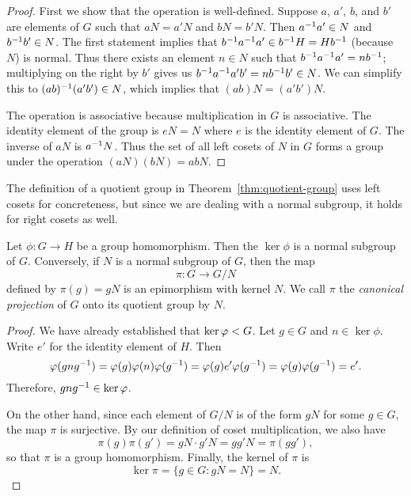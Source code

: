 \begin{proof}
    First we show that the operation is well-defined. Suppose \(a\), \(a'\),
    \(b\), and \(b'\) are elements of \(G\) such that \(aN = a'N\) and \(bN =
    b'N\). Then \(a^{-1} a' \in N\) and \(b^{-1} b' \in N\). The first statement
    implies that \(b^{-1} a^{-1} a' \in b^{-1} H = Hb^{-1}\) (because \(N\)) is
    normal. Thus there exists an element \(n \in N\) such that \(b^{-1} a^{-1} a'
    = nb^{-1}\); multiplying on the right by \(b'\) gives us \(b^{-1} a^{-1} a'b' =
    nb^{-1} b' \in N\). We can simplify this to \((ab)^{-1}(a'b') \in N\), which
    implies that \((ab)N = (a'b')N\).

    The operation is associative because multiplication in \(G\) is associative.
    The identity element of the group is \(eN = N\) where \(e\) is the identity
    element of \(G\). The inverse of \(aN\) is \(a^{-1} N\). Thus the set of all
    left cosets of \(N\) in \(G\) forms a group under the operation \((aN)(bN) =
    abN\).
\end{proof}

\begin{remark}
    The definition of a quotient group in Theorem~\ref{thm:quotient-group} uses
    left cosets for concreteness, but since we are dealing with a normal
    subgroup, it holds for right cosets as well.
\end{remark}

\begin{theorem}
    \label{thm:canonical-projection-grp}
    Let \(\phi : G \to H\) be a group homomorphism. Then the \(\ker \phi\) is a
    normal subgroup of \(G\). Conversely, if \(N\) is a normal subgroup of
    \(G\), then the map
    \[
        \pi : G \to G/N
    \]
    defined by \(\pi(g) = gN\) is an epimorphism with kernel \(N\). We call
    \(\pi\) the \emph{canonical projection} of \(G\) onto its quotient group by
    \(N\).
\end{theorem}

\begin{proof}
    We have already established that \(\ker \varphi < G\). Let \(g \in G\)
    and \(n \in \ker \phi\). Write \(e'\) for the identity element of \(H\).
    Then
    \[
        \varphi(gng^{-1}) = \varphi(g)\varphi(n)\varphi(g^{-1}) = \varphi(g)e'\varphi(g^{-1}) = \varphi(g)\varphi(g^{-1}) = e'.
    \]
    Therefore, \(gng^{-1} \in \ker \varphi\).

    On the other hand, since each element of \(G/N\) is of the form \(gN\) for
    some \(g \in G\), the map \(\pi\) is surjective. By our definition of coset
    multiplication, we also have
    \[
        \pi(g)\pi(g') = gN \cdot g'N = gg'N = \pi(gg'),
    \]
    so that \(\pi\) is a group homomorphism. Finally, the kernel of \(\pi\) is
    \[
        \ker \pi = \{g \in G : gN = N\} = N.
    \]
\end{proof}

